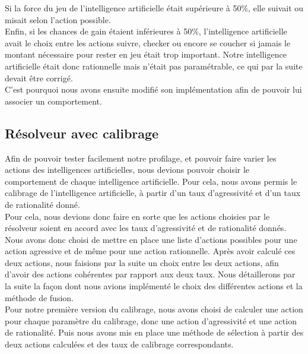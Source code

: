 \documentclass{report}
\begin{document}
Si la force du jeu de l'intelligence artificielle était supérieure à 50\%, elle suivait ou misait selon l'action possible.\\

Enfin, si les chances de gain étaient inférieures à 50\%, l'intelligence artificielle avait le choix entre les actions suivre, checker ou encore se coucher si jamais le montant nécessaire pour rester en jeu était trop important. Notre intelligence artificielle était donc rationnelle mais n'était pas paramétrable, ce qui par la suite devait être corrigé. \\
C'est pourquoi nous avons ensuite modifié son implémentation afin de pouvoir lui associer un comportement.\par


\subsection{Résolveur avec calibrage}

\hspace{0.5cm}Afin de pouvoir tester facilement notre profilage, et pouvoir faire varier les actions des intelligences artificielles, nous devions pouvoir choisir le comportement de chaque intelligence artificielle. Pour cela, nous avons permis le calibrage de l'intelligence artificielle, à partir d'un taux d'agressivité et d'un taux de rationalité donné.\\

Pour cela, nous devions donc faire en sorte que les actions choisies par le résolveur soient en accord avec les taux d'agressivité et de rationalité donnés. Nous avons donc choisi de mettre en place une liste d'actions possibles pour une action agressive et de même pour une action rationnelle. Après avoir calculé ces deux actions, nous faisions par la suite un choix entre les deux actions, afin d'avoir des actions cohérentes par rapport aux deux taux. Nous détaillerons par la suite la façon dont nous avions implémenté le choix des différentes actions et la méthode de fusion.\\

Pour notre première version du calibrage, nous avons choisi de calculer une action pour chaque paramètre du calibrage, donc une action d'agressivité et une action de rationalité. Puis nous avons mis en place une méthode de sélection à partir des deux actions calculées et des taux de calibrage correspondants.\\
\end{document}
